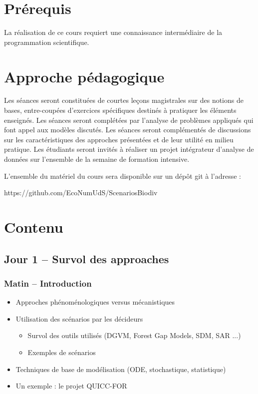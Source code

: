 \documentclass[12]{article}
\begin{document}
	\section*{Prérequis}

	La réalisation de ce cours requiert une connaissance intermédiaire de la
	programmation scientifique.


  \section*{Approche pédagogique}

Les séances seront constituées de courtes leçons magistrales sur des notions de
bases, entre-coupées d’exercices spécifiques destinés à pratiquer les éléments
enseignés. Les séances seront complétées par l'analyse de problèmes appliqués
qui font appel aux modèles discutés. Les séances seront complémentés de
discussions sur les caractéristiques des approches présentées et de leur utilité
en milieu pratique. Les étudiants seront invités à réaliser un projet
intégrateur d’analyse de données sur l’ensemble de la semaine de formation
intensive.

L’ensemble du matériel du cours sera disponible sur un dépôt git à l’adresse :

https://github.com/EcoNumUdS/ScenariosBiodiv


	\section*{Contenu}

  \subsection*{Jour 1 -- Survol des approaches}
  \subsubsection*{Matin -- Introduction}
  \begin{itemize}
    \item Approches phénoménologiques versus mécanistiques
    \item Utilisation des scénarios par les décideurs
    \begin{itemize}
      \item Survol des outils utilisés (DGVM, Forest Gap Models, SDM, SAR ...)
      \item Exemples de scénarios
    \end{itemize}
    \item Techniques de base de modélisation (ODE, stochastique, statistique)
    \item Un exemple : le projet QUICC-FOR
  \end{itemize}
\end{document}
